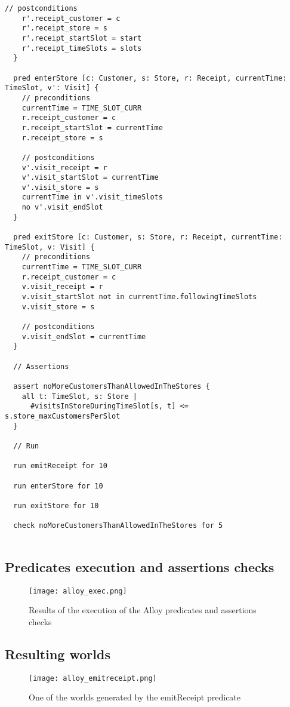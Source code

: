 \documentclass[../../main.tex]{subfiles}
\begin{document}
\begin{lstlisting}[language=alloy]
    // postconditions
    r'.receipt_customer = c
    r'.receipt_store = s
    r'.receipt_startSlot = start
    r'.receipt_timeSlots = slots
  }
  
  pred enterStore [c: Customer, s: Store, r: Receipt, currentTime: TimeSlot, v': Visit] {
    // preconditions
    currentTime = TIME_SLOT_CURR
    r.receipt_customer = c
    r.receipt_startSlot = currentTime
    r.receipt_store = s
  
    // postconditions
    v'.visit_receipt = r
    v'.visit_startSlot = currentTime
    v'.visit_store = s
    currentTime in v'.visit_timeSlots
    no v'.visit_endSlot
  }
  
  pred exitStore [c: Customer, s: Store, r: Receipt, currentTime: TimeSlot, v: Visit] {
    // preconditions
    currentTime = TIME_SLOT_CURR
    r.receipt_customer = c
    v.visit_receipt = r
    v.visit_startSlot not in currentTime.followingTimeSlots
    v.visit_store = s
    
    // postconditions
    v.visit_endSlot = currentTime
  }
  
  // Assertions
  
  assert noMoreCustomersThanAllowedInTheStores {
    all t: TimeSlot, s: Store |
      #visitsInStoreDuringTimeSlot[s, t] <= s.store_maxCustomersPerSlot
  }
  
  // Run
  
  run emitReceipt for 10
  
  run enterStore for 10
  
  run exitStore for 10
  
  check noMoreCustomersThanAllowedInTheStores for 5
  
\end{lstlisting}

\subsection{Predicates execution and assertions checks}

\begin{figure}[H]
  \centering
  \texttt{[image: alloy\_exec.png]}
  \caption{Results of the execution of the Alloy predicates and assertions checks}
\end{figure}

\subsection{Resulting worlds}

\begin{figure}[H]
  \centering
  \texttt{[image: alloy\_emitreceipt.png]}
  \caption{One of the worlds generated by the emitReceipt predicate}
\end{figure}
\end{document}
